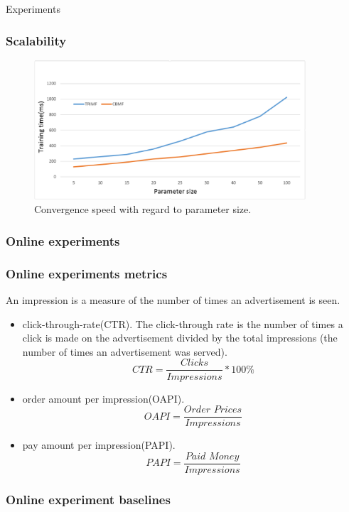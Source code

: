 \documentclass[xetex,mathserif,serif]{beamer}
\begin{document}
\begin{section}{Experiments}
\begin{frame}
\begin{figure}
\begin{center}
  \end{center}
\end{figure}
\end{frame}


  \begin{frame}
    \frametitle{Scalability}
        \begin{figure}
    \begin{center}
    \includegraphics[width=0.9\textwidth]{fig/cbmfsize.png} 
    \caption{Convergence speed with regard to parameter size.}

  \end{center}
\end{figure} 
\end{frame}

\begin{frame}
  \frametitle{Online experiments}

\end{frame}
\begin{frame}
  \frametitle{Online experiments metrics}
An impression is a measure of the number of times an advertisement is seen. 
\begin{itemize}
\item  click-through-rate(CTR). The click-through rate is the number of times a click is made on the advertisement divided by the total impressions (the number of times an advertisement was served). $$CTR = \frac{Clicks}{Impressions} * 100\%$$
\item  order amount per impression(OAPI). $$OAPI = \frac{Order \,\,Prices}{Impressions}$$
\item  pay amount per impression(PAPI). $$PAPI = \frac{Paid \,\,Money}{Impressions}$$
\end{itemize}
\end{frame}
\begin{frame}
  \frametitle{Online experiment baselines}
\begin{itemize}


\end{itemize}
\end{frame}
\end{section}
\end{document}
